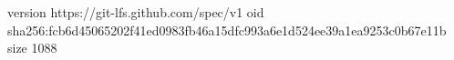 version https://git-lfs.github.com/spec/v1
oid sha256:fcb6d45065202f41ed0983fb46a15dfc993a6e1d524ee39a1ea9253c0b67e11b
size 1088
